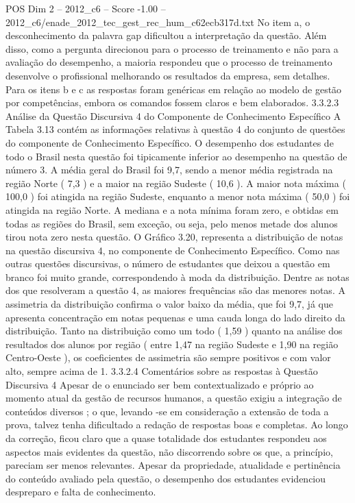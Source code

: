 \begin{textsample}{POS Dim 2 – 2012\_c6 – Score -1.00 – 2012\_c6/enade\_2012\_tec\_gest\_rec\_hum\_c62ecb317d.txt}
No item a, o desconhecimento da palavra gap dificultou a interpretação da questão.
Além disso, como a pergunta direcionou para o processo de treinamento e não para a avaliação do desempenho, a maioria respondeu que o processo de treinamento desenvolve o profissional melhorando os resultados da empresa, sem detalhes.
Para os itens b e c as respostas foram genéricas em relação ao modelo de gestão por competências, embora os comandos fossem claros e bem elaborados. 3.3.2.3 Análise da Questão Discursiva 4 do Componente de Conhecimento Específico A Tabela 3.13 contém as informações relativas à questão 4 do conjunto de questões do componente de Conhecimento Específico.
O desempenho dos estudantes de todo o Brasil nesta questão foi tipicamente inferior ao desempenho na questão de número 3.
A média geral do Brasil foi 9,7, sendo a menor média registrada na região Norte ( 7,3 ) e a maior na região Sudeste ( 10,6 ).
A maior nota máxima ( 100,0 ) foi atingida na região Sudeste, enquanto a menor nota máxima ( 50,0 ) foi atingida na região Norte.
A mediana e a nota mínima foram zero, e obtidas em todas as regiões do Brasil, sem exceção, ou seja, pelo menos metade dos alunos tirou nota zero nesta questão.
O Gráfico 3.20, representa a distribuição de notas na questão discursiva 4, no componente de Conhecimento Específico.
Como nas outras questões discursivas, o número de estudantes que deixou a questão em branco foi muito grande, correspondendo à moda da distribuição.
Dentre as notas dos que resolveram a questão 4, as maiores frequências são das menores notas.
A assimetria da distribuição confirma o valor baixo da média, que foi 9,7, já que apresenta concentração em notas pequenas e uma cauda longa do lado direito da distribuição.
Tanto na distribuição como um todo ( 1,59 ) quanto na análise dos resultados dos alunos por região ( entre 1,47 na região Sudeste e 1,90 na região Centro-Oeste ), os coeficientes de assimetria são sempre positivos e com valor alto, sempre acima de 1. 3.3.2.4 Comentários sobre as respostas à Questão Discursiva 4 Apesar de o enunciado ser bem contextualizado e próprio ao momento atual da gestão de recursos humanos, a questão exigiu a integração de conteúdos diversos ; o que, levando -se em consideração a extensão de toda a prova, talvez tenha dificultado a redação de respostas boas e completas.
Ao longo da correção, ficou claro que a quase totalidade dos estudantes respondeu aos aspectos mais evidentes da questão, não discorrendo sobre os que, a princípio, pareciam ser menos relevantes.
Apesar da propriedade, atualidade e pertinência do conteúdo avaliado pela questão, o desempenho dos estudantes evidenciou despreparo e falta de conhecimento.

\end{textsample}
